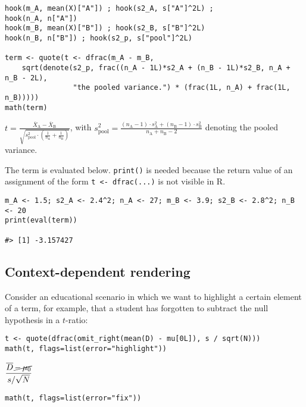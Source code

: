 \begin{verbatim}
hook(m_A, mean(X)["A"]) ; hook(s2_A, s["A"]^2L) ;
hook(n_A, n["A"])
hook(m_B, mean(X)["B"]) ; hook(s2_B, s["B"]^2L)
hook(n_B, n["B"]) ; hook(s2_p, s["pool"]^2L)

term <- quote(t <- dfrac(m_A - m_B, 
    sqrt(denote(s2_p, frac((n_A - 1L)*s2_A + (n_B - 1L)*s2_B, n_A + n_B - 2L),
                "the pooled variance.") * (frac(1L, n_A) + frac(1L, n_B)))))
math(term)
\end{verbatim}

\({t}{=}{\displaystyle{\frac{{{\overline{X}}_{\mathrm{A}}}{-}{{\overline{X}}_{\mathrm{B}}}}{\sqrt{{{s}_{\mathrm{pool}}^{2}}{\cdot}{\left({\frac{1}{{n}_{\mathrm{A}}}}{+}{\frac{1}{{n}_{\mathrm{B}}}}\right)}}}}}\),
with
\({{s}_{\mathrm{pool}}^{2}}{=}{\frac{{{\left({{n}_{\mathrm{A}}}{-}{1}\right)}{\cdot}{{s}_{\mathrm{A}}^{2}}}{+}{{\left({{n}_{\mathrm{B}}}{-}{1}\right)}{\cdot}{{s}_{\mathrm{B}}^{2}}}}{{{{n}_{\mathrm{A}}}{+}{{n}_{\mathrm{B}}}}{-}{2}}}\)
denoting the pooled variance.

The term is evaluated below. \texttt{print()} is needed because the return
value of an assignment of the form \texttt{t~\textless{}-~dfrac(...)} is not visible in
R.

\begin{verbatim}
m_A <- 1.5; s2_A <- 2.4^2; n_A <- 27; m_B <- 3.9; s2_B <- 2.8^2; n_B <- 20
print(eval(term))

#> [1] -3.157427
\end{verbatim}

\hypertarget{context-dependent-rendering}{%
\subsection{Context-dependent rendering}\label{context-dependent-rendering}}

Consider an educational scenario in which we want to highlight a certain
element of a term, for example, that a student has forgotten to subtract
the null hypothesis in a \(t\)-ratio:

\begin{verbatim}
t <- quote(dfrac(omit_right(mean(D) - mu[0L]), s / sqrt(N)))
math(t, flags=list(error="highlight"))
\end{verbatim}

\(\displaystyle{\frac{{\overline{D}}{{\,}{\cancel{{-}{{\,}{{\mu}_{0}}}}}}}{{s}{/}{\sqrt{N}}}}\)

\begin{verbatim}
math(t, flags=list(error="fix"))
\end{verbatim}

